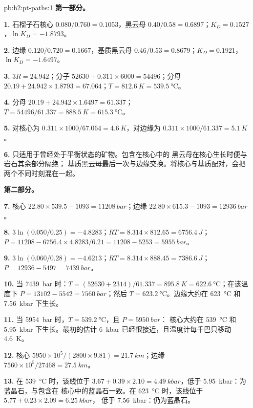 \begin{solution}{pb:b2:pt-paths:1}
\noindent\textbf{第一部分。}

\textbf{1.} 石榴子石核心 $0.080/0.760 = 0.1053$，黑云母 $0.40/0.58 = 0.6897$；$K_D =
0.1527$，$\ln K_D = -1.8793$。

\textbf{2.} 边缘 $0.120/0.720 = 0.1667$，基质黑云母 $0.46/0.53 = 0.8679$；$K_D =
0.1921$，$\ln K_D = -1.6497$。

\textbf{3.} $3R = 24.942$；分子 $52630 + 0.311\times6000 = 54496$；分母 $20.19
+ 24.942\times1.8793 = 67.064$；$T = \qty{812.6}{K} = \qty{539.5}{\celsius}$。

\textbf{4.} 分母 $20.19 + 24.942\times1.6497 = 61.337$；$T = 54496/61.337 =
\qty{888.5}{K} = \qty{615.3}{\celsius}$。

\textbf{5.} 对核心为 $0.311\times1000/67.064 = \qty{4.6}{K}$，对边缘为 $0.311\times1000/61.337
= \qty{5.1}{K}$。

\textbf{6.} 只适用于曾经处于平衡状态的矿物。包含在核心中的
黑云母在核心生长时便与岩石其余部分隔绝；
基质黑云母最后一次与边缘交换。将核心与基质配对，会把
两个不同时刻混在一起。

\noindent\textbf{第二部分。}

\textbf{7.} 核心 $22.80\times539.5 - 1093 = \qty{11208}{bar}$；边缘 $22.80\times615.3 -
1093 = \qty{12936}{bar}$。

\textbf{8.} $3\ln(0.050/0.25) = -4.8283$；$RT = 8.314\times812.65 = \qty{6756.4}{J}$；$P =
11208 - 6756.4\times4.8283/6.21 = 11208 - 5253 = \qty{5955}{bar}$。

\textbf{9.} $3\ln(0.060/0.28) = -4.6213$；$RT = 8.314\times888.45 = \qty{7386.6}{J}$；$P
= 12936 - 5497 = \qty{7439}{bar}$。

\textbf{10.} 当 \qty{7439}{bar} 时：$T = (52630 + 2314)/61.337 = \qty{895.8}{K} =
\qty{622.6}{\celsius}$；在该温度下 $P = 13102 - 5542 = \qty{7560}{bar}$；然后 $T
= \qty{623.2}{\celsius}$。边缘大约在 \qty{623}{\celsius} 和 \qty{7.56}{kbar} 下生长。

\textbf{11.} 当 \qty{5954}{bar} 时，$T = \qty{539.2}{\celsius}$，且 $P = \qty{5950}{bar}$：
核心大约在 \qty{539}{\celsius} 和 \qty{5.95}{kbar} 下生长。最初的估计
\qty{6}{kbar} 已经很接近，且温度计每千巴只移动 \qty{4.6}{K}。

\textbf{12.} 核心 $5950\times10^5/(2800\times9.81) = \qty{21.7}{km}$；边缘
$7560\times10^5/27468 = \qty{27.5}{km}$。

\textbf{13.} 在 \qty{539}{\celsius} 时，该线位于 $3.67 + 0.39\times2.10 =
\qty{4.49}{kbar}$，低于 \qty{5.95}{kbar}：为蓝晶石，与包含在
核心中的蓝晶石一致。在 \qty{623}{\celsius} 时，该线位于 $5.77 + 0.23\times2.09 = \qty{6.25}{kbar}$，
低于 \qty{7.56}{kbar}：仍为蓝晶石。


\end{solution}
